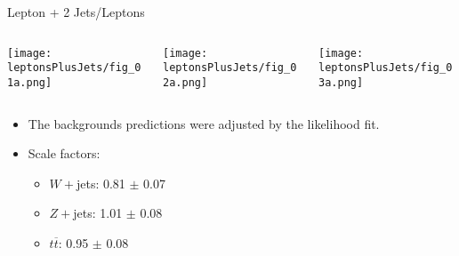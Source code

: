 \documentclass[8pt]{beamer}
\begin{document}
\begin{frame}{\large Lepton + 2 Jets/Leptons}
\begin{columns}
 \begin{column}{4cm}
  \texttt{[image: leptonsPlusJets/fig\_01a.png]}\\
 \end{column}
 \begin{column}{4cm}
  \texttt{[image: leptonsPlusJets/fig\_02a.png]}\\
 \end{column}
 \begin{column}{4cm}
  \texttt{[image: leptonsPlusJets/fig\_03a.png]}\\
 \end{column}
\end{columns}
\begin{itemize}
 \item The backgrounds predictions were adjusted by the likelihood fit.
 \item Scale factors:
 \begin{itemize}
  \item $W+$jets: 0.81 $\pm$ 0.07 
  \item $Z+$jets: 1.01 $\pm$ 0.08
  \item $t\overline{t}$: 0.95 $\pm$ 0.08
 \end{itemize}

\end{itemize}

\end{frame}
\end{document}
